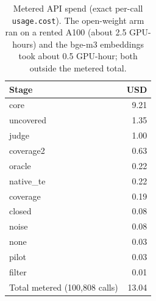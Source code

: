 \begin{table}[h]\centering\small
\begin{tabular}{lr}
\toprule
Stage & USD \\
\midrule
core & 9.21 \\
uncovered & 1.35 \\
judge & 1.00 \\
coverage2 & 0.63 \\
oracle & 0.22 \\
native\_te & 0.22 \\
coverage & 0.19 \\
closed & 0.08 \\
noise & 0.08 \\
none & 0.03 \\
pilot & 0.03 \\
filter & 0.01 \\
\midrule
Total metered (100{,}808 calls) & 13.04 \\
\bottomrule
\end{tabular}
\caption{Metered API spend (exact per-call \texttt{usage.cost}). The open-weight arm ran on a rented A100 (about 2.5 GPU-hours) and the bge-m3 embeddings took about 0.5 GPU-hour; both outside the metered total.}
\label{tab:cost}
\end{table}